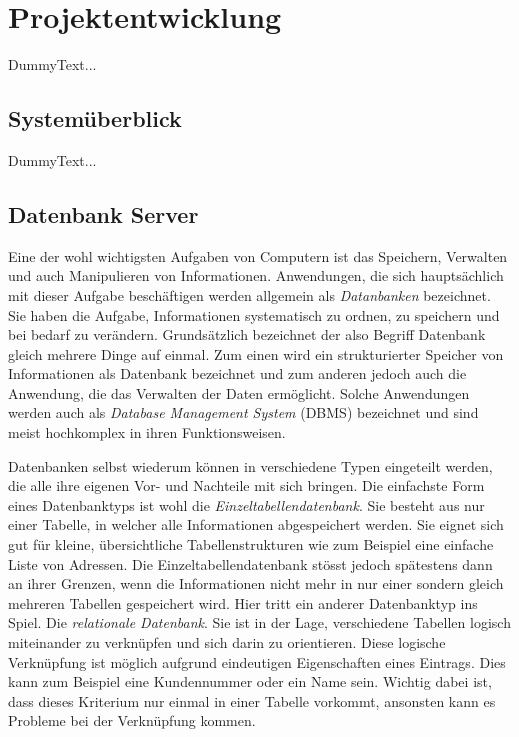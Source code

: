 \documentclass[a4paper,11pt]{report}
\begin{document}
	
	\chapter{Projektentwicklung}
	DummyText...
		\section{Systemüberblick}
		DummyText...
		
			\section{Datenbank Server}
			Eine der wohl wichtigsten Aufgaben von Computern ist das Speichern, Verwalten und auch Manipulieren von Informationen. Anwendungen, die sich hauptsächlich mit dieser Aufgabe beschäftigen werden allgemein als \emph{Datanbanken} bezeichnet. Sie haben die Aufgabe, Informationen systematisch zu ordnen, zu speichern und bei bedarf zu verändern. Grundsätzlich bezeichnet der also Begriff Datenbank gleich mehrere Dinge auf einmal. Zum einen wird ein strukturierter Speicher von Informationen als Datenbank bezeichnet und zum anderen jedoch auch die Anwendung, die das Verwalten der Daten ermöglicht. Solche Anwendungen werden auch als \emph{Database Management System} (DBMS) bezeichnet und sind meist hochkomplex in ihren Funktionsweisen. \cite{IT-Handbuch}
			
			Datenbanken selbst wiederum können in  verschiedene Typen eingeteilt werden, die alle ihre eigenen Vor- und Nachteile mit sich bringen. Die einfachste Form eines Datenbanktyps ist wohl die \emph{Einzeltabellendatenbank}. Sie besteht aus nur einer Tabelle, in welcher alle Informationen abgespeichert werden. Sie eignet sich gut für kleine, übersichtliche Tabellenstrukturen wie zum Beispiel eine einfache Liste von Adressen. Die Einzeltabellendatenbank stösst jedoch spätestens dann an ihrer Grenzen, wenn die Informationen nicht mehr in nur einer sondern gleich mehreren Tabellen gespeichert wird. Hier tritt ein anderer Datenbanktyp ins Spiel. Die \emph{relationale Datenbank}. Sie ist in der Lage, verschiedene Tabellen logisch miteinander zu verknüpfen und sich darin zu orientieren. Diese logische Verknüpfung ist möglich aufgrund eindeutigen Eigenschaften eines Eintrags. Dies kann zum Beispiel eine Kundennummer oder ein Name sein. Wichtig dabei ist, dass dieses Kriterium nur einmal in einer Tabelle vorkommt, ansonsten kann es Probleme bei der Verknüpfung kommen.\cite{IT-Handbuch}
\end{document}
